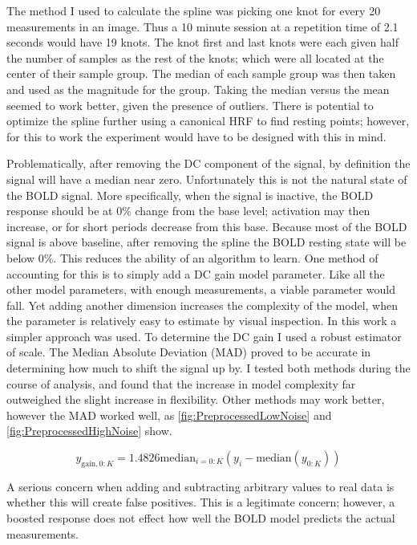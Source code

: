 The method I used to calculate the spline was picking one knot for every 20
measurements in an image. Thus a 10 minute session at a repetition time of 
2.1 seconds would have 19 knots. The knot first and last knots were each 
given half the number of samples as the rest of the knots; which were all 
located at the center of their sample group. The median of each sample group
was then taken and used as the magnitude for the group. Taking the median 
versus the mean seemed to work better, given the presence of outliers. 
There is potential to optimize the spline further using a canonical 
HRF to find resting points; however, for this to work the experiment would have
to be designed with this in mind. 

Problematically, after removing the DC component of the signal,
by definition the signal will have a median near zero. 
Unfortunately this is not the natural state of the BOLD signal. More specifically,
when the signal is inactive, the BOLD response should be at 0\% change from
the base level; activation may then increase, or for short periods decrease from this base.
Because most of the BOLD signal is above baseline, after removing the spline
the BOLD resting state will be below 0\%.  This reduces the ability of an algorithm to learn.
One method of accounting for this is to simply add a DC gain model parameter.
Like all the other model parameters, with enough measurements, a viable
parameter would fall. Yet adding another dimension increases the
complexity of the model, when the parameter is relatively easy to estimate
by visual inspection.  In this work a simpler approach was used. To determine
the DC gain I used a robust estimator of scale. The Median Absolute Deviation (MAD)
proved to be accurate in determining how much to shift the signal up
by. I tested both methods during the course of analysis, and found that the increase 
in model complexity far outweighed the slight increase in flexibility. Other
methods may work better, however the MAD worked well, 
as \autoref{fig:PreprocessedLowNoise} and \autoref{fig:PreprocessedHighNoise} show. 

\begin{equation}
y_{\text{gain}, 0:K} = 1.4826\text{median}_{i=0:K}(y_i - \text{median}(y_{0:K}))
\end{equation}

A serious concern when adding and subtracting arbitrary values to 
real data is whether this will create false positives. This is a legitimate
concern; however, a boosted response does not effect how well the BOLD model 
predicts the actual measurements. 


